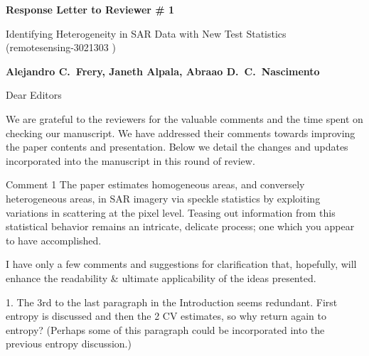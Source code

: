 \documentclass[11pt]{report}
\begin{document}
\begin{center}
\large{\textbf{Response Letter to Reviewer \# 1}}

\vglue 0.3cm

\huge{ Identifying Heterogeneity in SAR Data with New Test Statistics\\ (remotesensing-3021303 )}
\end{center}

\begin{center}
\textbf{Alejandro C.\ Frery, Janeth Alpala, Abraao D.\ C.\ Nascimento }
\end{center}

\date{\today}



\vspace{2cm}
\noindent Dear Editors
\bigskip

\noindent We are grateful to the reviewers for the valuable comments and the time spent on checking our manuscript. 
We have addressed their comments towards improving the paper contents and presentation. 
Below we detail the changes and updates incorporated into the manuscript in this round of review.

\medskip


\begin{reviewbox}{Comment 1}
The paper estimates homogeneous areas, and conversely heterogeneous areas, in SAR imagery via speckle statistics by exploiting variations in scattering at the pixel level. Teasing out information from this statistical behavior remains an intricate, delicate process; one which you appear to have accomplished. 

I have only a few comments and suggestions for clarification that, hopefully, will enhance the readability \& ultimate applicability of the ideas presented.

1. The 3rd to the last paragraph in the Introduction seems redundant. First entropy is discussed and then the 2 CV estimates, so why return again to entropy? (Perhaps some of this paragraph could be incorporated into the previous entropy discussion.)
\end{reviewbox}
\end{document}
